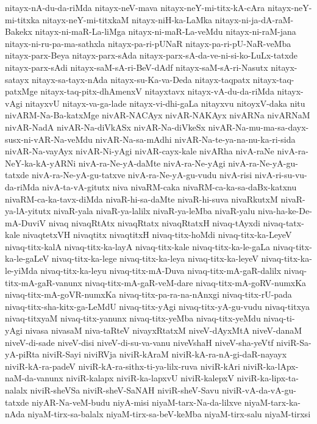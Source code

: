 {nitayx-nA-du-da-riMda
nitayx-neV-mava
nitayx-neY-mi-titx-kA-cAra
nitayx-neY-mi-titxka
nitayx-neY-mi-titxkaM
nitayx-niH-ka-LaMka
nitayx-ni-ja-dA-raM-Bakekx
nitayx-ni-maR-La-liMga
nitayx-ni-maR-La-veMdu
nitayx-ni-raM-jana
nitayx-ni-ru-pa-ma-sathxla
nitayx-pa-ri-pUNaR
nitayx-pa-ri-pU-NaR-veMba
nitayx-parx-Beya
nitayx-parx-sAda
nitayx-parx-sA-da-ve-ni-si-ko-LuLx-tatxde
nitayx-parx-sAdi
nitayx-saM-sA-ri-BeV-dAdf
nitayx-saM-sA-ri-Nasutx
nitayx-satayx
nitayx-sa-tayx-nAda
nitayx-su-Ka-va-Deda
nitayx-taqpatx
nitayx-taq-patxMge
nitayx-taq-pitx-dhAmenxV
nitayxtavx
nitayx-vA-du-da-riMda
nitayx-vAgi
nitayxvU
nitayx-va-ga-lade
nitayx-vi-dhi-gaLa
nitayxvu
nitoyxV-daka
nitu
nivARM-Na-Ba-katxMge
nivAR-NACAyx
nivAR-NAKAyx
nivARNa
nivARNaM
nivAR-NadA
nivAR-Na-diVkASx
nivAR-Na-diVkeSx
nivAR-Na-mu-ma-sa-dayx-susx-ni-vAR-Na-veMdu
nivAR-Na-sa-mAdhi
nivAR-Na-te-ya-na-nu-ka-ri-sida
nivAR-Na-vayAyx
nivAR-Ni-yAgi
nivAR-cayx-kale
nivARha
nivA-raNe
nivA-ra-NeY-ka-kA-yARNi
nivA-ra-Ne-yA-daMte
nivA-ra-Ne-yAgi
nivA-ra-Ne-yA-gu-tatxde
nivA-ra-Ne-yA-gu-tatxve
nivA-ra-Ne-yA-gu-vudu
nivA-risi
nivA-ri-su-vu-da-riMda
nivA-ta-vA-gitutx
niva
nivaRM-caka
nivaRM-ca-ka-sa-daBx-katxnu
nivaRM-ca-ka-tavx-diMda
nivaR-hi-sa-daMte
nivaR-hi-suva
nivaRkutxM
nivaR-ya-lA-yitutx
nivaR-yala
nivaR-ya-lalilx
nivaR-ya-leMba
nivaR-yalu
niva-ha-ke-De-mA-DuviV
nivaq
nivaqRtAtx
nivaqRtatx
nivaqRtatxH
nivaq-tAyxdi
nivaq-tatx-kale
nivaqtetxVH
nivaqtitx
nivaqtitxH
nivaq-titx-hoMdi
nivaq-titx-ka-LeyeV
nivaq-titx-kalA
nivaq-titx-ka-layA
nivaq-titx-kale
nivaq-titx-ka-le-gaLa
nivaq-titx-ka-le-gaLeV
nivaq-titx-ka-lege
nivaq-titx-ka-leya
nivaq-titx-ka-leyeV
nivaq-titx-ka-le-yiMda
nivaq-titx-ka-leyu
nivaq-titx-mA-Duva
nivaq-titx-mA-gaR-dalilx
nivaq-titx-mA-gaR-vanunx
nivaq-titx-mA-gaR-veM-dare
nivaq-titx-mA-goRV-numxKa
nivaq-titx-mA-goVR-numxKa
nivaq-titx-pa-ra-na-nAnxgi
nivaq-titx-rU-pada
nivaq-titx-sha-kitx-ga-LeMdU
nivaq-titx-yAgi
nivaq-titx-yA-gu-vudu
nivaq-titxya
nivaq-titxyaM
nivaq-titx-yanunx
nivaq-titx-yeMba
nivaq-titx-yeMdu
nivaq-ti-yAgi
nivasa
nivasaM
niva-taRteV
nivayxRtatxM
niveV-dAyxMtA
niveV-danaM
niveV-di-sade
niveV-disi
niveV-di-su-va-vanu
niveVshaH
niveV-sha-yeVtf
niviR-Sa-yA-piRta
niviR-Sayi
niviRVja
niviR-kAraM
niviR-kA-ra-nA-gi-daR-nayayx
niviR-kA-ra-padeV
niviR-kA-ra-sithx-ti-ya-lilx-ruva
niviR-kAri
niviR-ka-lApx-naM-da-vanunx
niviR-kalapx
niviR-ka-lapxvU
niviR-kalepxV
niviR-ka-lipx-ta-nalalx
niviR-sheVSa
niviR-sheV-SaNAH
niviR-sheV-Savu
niviR-vA-da-vA-gu-tatxde
niyAR-Na-veM-budu
niyA-misi
niyaM-tarx-Na-da-lilxve
niyaM-tarx-ka-nAda
niyaM-tirx-sa-balalx
niyaM-tirx-sa-beV-keMba
niyaM-tirx-salu
niyaM-tirxsi
}
